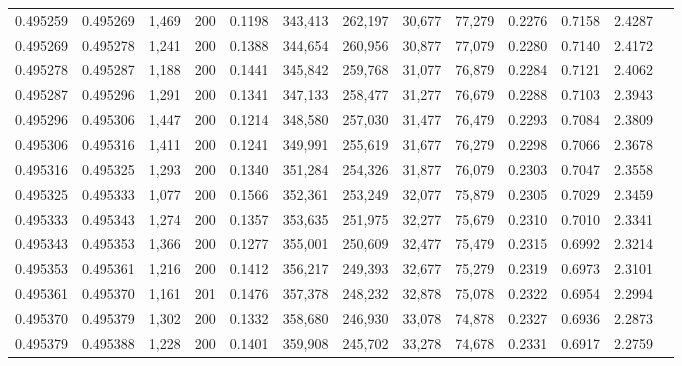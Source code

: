 \begin{tabular}{rrrrrrrrrrrrr}
0.495259 & 0.495269 & 1,469 & 200 &                                     0.1198 & 343,413 & 262,197 &  30,677 &  77,279 & 0.2276 & 0.7158 & 2.4287 \\
0.495269 & 0.495278 & 1,241 & 200 &                                     0.1388 & 344,654 & 260,956 &  30,877 &  77,079 & 0.2280 & 0.7140 & 2.4172 \\
0.495278 & 0.495287 & 1,188 & 200 &                                     0.1441 & 345,842 & 259,768 &  31,077 &  76,879 & 0.2284 & 0.7121 & 2.4062 \\
0.495287 & 0.495296 & 1,291 & 200 &                                     0.1341 & 347,133 & 258,477 &  31,277 &  76,679 & 0.2288 & 0.7103 & 2.3943 \\
0.495296 & 0.495306 & 1,447 & 200 &                                     0.1214 & 348,580 & 257,030 &  31,477 &  76,479 & 0.2293 & 0.7084 & 2.3809 \\
0.495306 & 0.495316 & 1,411 & 200 &                                     0.1241 & 349,991 & 255,619 &  31,677 &  76,279 & 0.2298 & 0.7066 & 2.3678 \\
0.495316 & 0.495325 & 1,293 & 200 &                                     0.1340 & 351,284 & 254,326 &  31,877 &  76,079 & 0.2303 & 0.7047 & 2.3558 \\
0.495325 & 0.495333 & 1,077 & 200 &                                     0.1566 & 352,361 & 253,249 &  32,077 &  75,879 & 0.2305 & 0.7029 & 2.3459 \\
0.495333 & 0.495343 & 1,274 & 200 &                                     0.1357 & 353,635 & 251,975 &  32,277 &  75,679 & 0.2310 & 0.7010 & 2.3341 \\
0.495343 & 0.495353 & 1,366 & 200 &                                     0.1277 & 355,001 & 250,609 &  32,477 &  75,479 & 0.2315 & 0.6992 & 2.3214 \\
0.495353 & 0.495361 & 1,216 & 200 &                                     0.1412 & 356,217 & 249,393 &  32,677 &  75,279 & 0.2319 & 0.6973 & 2.3101 \\
0.495361 & 0.495370 & 1,161 & 201 &                                     0.1476 & 357,378 & 248,232 &  32,878 &  75,078 & 0.2322 & 0.6954 & 2.2994 \\
0.495370 & 0.495379 & 1,302 & 200 &                                     0.1332 & 358,680 & 246,930 &  33,078 &  74,878 & 0.2327 & 0.6936 & 2.2873 \\
0.495379 & 0.495388 & 1,228 & 200 &                                     0.1401 & 359,908 & 245,702 &  33,278 &  74,678 & 0.2331 & 0.6917 & 2.2759 \\

\end{tabular}
